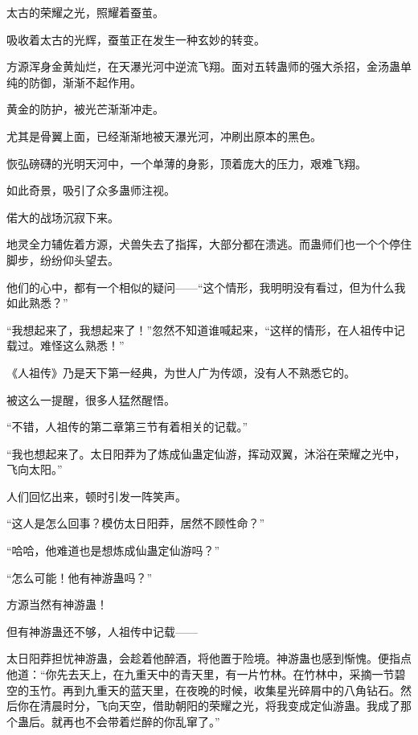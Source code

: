 
\begin{this_body}

太古的荣耀之光，照耀着蚕茧。

吸收着太古的光辉，蚕茧正在发生一种玄妙的转变。

方源浑身金黄灿烂，在天瀑光河中逆流飞翔。面对五转蛊师的强大杀招，金汤蛊单纯的防御，渐渐不起作用。

黄金的防护，被光芒渐渐冲走。

尤其是骨翼上面，已经渐渐地被天瀑光河，冲刷出原本的黑色。

恢弘磅礴的光明天河中，一个单薄的身影，顶着庞大的压力，艰难飞翔。

如此奇景，吸引了众多蛊师注视。

偌大的战场沉寂下来。

地灵全力辅佐着方源，犬兽失去了指挥，大部分都在溃逃。而蛊师们也一个个停住脚步，纷纷仰头望去。

他们的心中，都有一个相似的疑问——“这个情形，我明明没有看过，但为什么我如此熟悉？”

“我想起来了，我想起来了！”忽然不知道谁喊起来，“这样的情形，在人祖传中记载过。难怪这么熟悉！”

《人祖传》乃是天下第一经典，为世人广为传颂，没有人不熟悉它的。

被这么一提醒，很多人猛然醒悟。

“不错，人祖传的第二章第三节有着相关的记载。”

“我也想起来了。太日阳莽为了炼成仙蛊定仙游，挥动双翼，沐浴在荣耀之光中，飞向太阳。”

人们回忆出来，顿时引发一阵笑声。

“这人是怎么回事？模仿太日阳莽，居然不顾性命？”

“哈哈，他难道也是想炼成仙蛊定仙游吗？”

“怎么可能！他有神游蛊吗？”

方源当然有神游蛊！

但有神游蛊还不够，人祖传中记载——

太日阳莽担忧神游蛊，会趁着他醉酒，将他置于险境。神游蛊也感到惭愧。便指点他道：“你先去天上，在九重天中的青天里，有一片竹林。在竹林中，采摘一节碧空的玉竹。再到九重天的蓝天里，在夜晚的时候，收集星光碎屑中的八角钻石。然后你在清晨时分，飞向天空，借助朝阳的荣耀之光，将我变成定仙游蛊。我成了那个蛊后。就再也不会带着烂醉的你乱窜了。”


\end{this_body}
